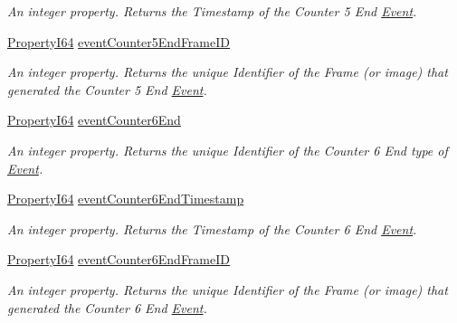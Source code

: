 \begin{DoxyCompactItemize}
\begin{DoxyCompactList}\small\item\em An integer property. Returns the Timestamp of the Counter 5 End \hyperlink{classmv_i_m_p_a_c_t_1_1acquire_1_1_event}{Event}. \end{DoxyCompactList}\item 
\hyperlink{group___common_interface_ga81749b2696755513663492664a18a893}{Property\+I64} \hyperlink{classmv_i_m_p_a_c_t_1_1acquire_1_1_gen_i_cam_1_1_event_control_ab2c913feeb75292f2d7f5752803b8c67}{event\+Counter5\+End\+Frame\+I\+D}
\begin{DoxyCompactList}\small\item\em An integer property. Returns the unique Identifier of the Frame (or image) that generated the Counter 5 End \hyperlink{classmv_i_m_p_a_c_t_1_1acquire_1_1_event}{Event}. \end{DoxyCompactList}\item 
\hyperlink{group___common_interface_ga81749b2696755513663492664a18a893}{Property\+I64} \hyperlink{classmv_i_m_p_a_c_t_1_1acquire_1_1_gen_i_cam_1_1_event_control_a42b5e147e9269213e49f2d28ab30b254}{event\+Counter6\+End}
\begin{DoxyCompactList}\small\item\em An integer property. Returns the unique Identifier of the Counter 6 End type of \hyperlink{classmv_i_m_p_a_c_t_1_1acquire_1_1_event}{Event}. \end{DoxyCompactList}\item 
\hyperlink{group___common_interface_ga81749b2696755513663492664a18a893}{Property\+I64} \hyperlink{classmv_i_m_p_a_c_t_1_1acquire_1_1_gen_i_cam_1_1_event_control_ab5bc3309793bc41fe1530e1408aac163}{event\+Counter6\+End\+Timestamp}
\begin{DoxyCompactList}\small\item\em An integer property. Returns the Timestamp of the Counter 6 End \hyperlink{classmv_i_m_p_a_c_t_1_1acquire_1_1_event}{Event}. \end{DoxyCompactList}\item 
\hyperlink{group___common_interface_ga81749b2696755513663492664a18a893}{Property\+I64} \hyperlink{classmv_i_m_p_a_c_t_1_1acquire_1_1_gen_i_cam_1_1_event_control_a6dfa5af384da606cdb873710cb35dd32}{event\+Counter6\+End\+Frame\+I\+D}
\begin{DoxyCompactList}\small\item\em An integer property. Returns the unique Identifier of the Frame (or image) that generated the Counter 6 End \hyperlink{classmv_i_m_p_a_c_t_1_1acquire_1_1_event}{Event}. \end{DoxyCompactList}\item 

\end{DoxyCompactItemize}
